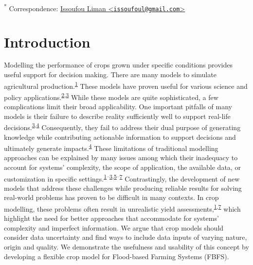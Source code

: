 \documentclass[12pt,oneside]{article}
\begin{document}
\textsuperscript{*} Correspondence:
\href{mailto:issoufoul@gmail.com}{Issoufou Liman
\textless{}\href{mailto:issoufoul@gmail.com}{\nolinkurl{issoufoul@gmail.com}}\textgreater{}}

\hypertarget{introduction}{%
\section{Introduction}\label{introduction}}

Modelling the performance of crops grown under specific conditions
provides useful support for decision making. There are many models to
simulate agricultural
production.\textsuperscript{\protect\hyperlink{ref-Murthy_2004}{1}}
These models have proven useful for various science and policy
applications.\textsuperscript{\protect\hyperlink{ref-Boote_et_al_1996}{2},\protect\hyperlink{ref-Cerdan_et_al_2002}{3}}
While these models are quite sophisticated, a few complications limit
their broad applicability. One important pitfalls of many models is
their failure to describe reality sufficiently well to support real-life
decisions.\textsuperscript{\protect\hyperlink{ref-Cerdan_et_al_2002}{3},\protect\hyperlink{ref-Luedeling_et_al_2017}{4}}
Consequently, they fail to address their dual purpose of generating
knowledge while contributing actionable information to support decisions
and ultimately generate
impacts.\textsuperscript{\protect\hyperlink{ref-Luedeling_et_al_2017}{4}}
These limitations of traditional modelling approaches can be explained
by many issues among which their inadequacy to account for systems'
complexity, the scope of application, the available data, or
customization in specific
settings.\textsuperscript{\protect\hyperlink{ref-Murthy_2004}{1}--\protect\hyperlink{ref-Cerdan_et_al_2002}{3},\protect\hyperlink{ref-Luedeling_and_Shepherd_2016}{5}--\protect\hyperlink{ref-VanIttersum_et_al_2013}{7}}
Contrastingly, the development of new models that address these
challenges while producing reliable results for solving real-world
problems has proven to be difficult in many contexts. In crop modelling,
these problems often result in unrealistic yield
assessments,\textsuperscript{\protect\hyperlink{ref-Murthy_2004}{1},\protect\hyperlink{ref-VanIttersum_et_al_2013}{7}}
which highlight the need for better approaches that accommodate for
systems' complexity and imperfect information. We argue that crop models
should consider data uncertainty and find ways to include data inputs of
varying nature, origin and quality. We demonstrate the usefulness and
usability of this concept by developing a flexible crop model for
Flood-based Farming Systems (FBFS).
\end{document}
